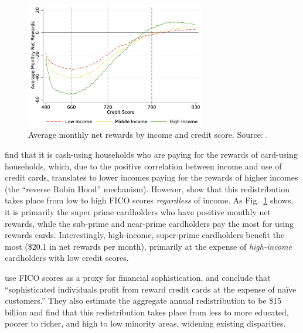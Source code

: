 \begin{figure}[t!h]
    \begin{center}
    \includegraphics[width=0.7\textwidth]{../Misc/Agarwal_NetRewardsByIncome.png}
    \caption{Average monthly net rewards by income and credit score. Source: \citet{agaretal:2023}.}
    \label{fig:AgarwalRewards}
    \end{center}
\end{figure}

\citet*{schuetal:2010} find that it is cash-using households who are paying for the rewards of card-using households, which, due to the positive correlation between income and use of credit cards, translates to lower incomes paying for the rewards of higher incomes (the ``reverse Robin Hood'' mechanism). 
However, \citet*{agaretal:2023} show that this redistribution takes place from low to high FICO scores \emph{regardless} of income.
As Fig.~\ref{fig:AgarwalRewards} shows, it is primarily the super prime cardholders who have positive monthly net rewards, while the sub-prime and near-prime cardholders pay the most for using rewards cards. Interestingly, high-income, super-prime cardholders benefit the most (\$20.1 in net rewards per month), primarily at the expense of \emph{high-income} cardholders with low credit scores.

\citet*{agaretal:2023} use FICO scores as a proxy for financial sophistication, and conclude that ``sophisticated individuals profit from reward credit cards at the expense of na\"{i}ve customers.''
They also estimate the aggregate annual redistribution to be \$15 billion and find that this redistribution takes place from less to more educated, poorer to richer, and high to low minority areas, widening existing disparities.


